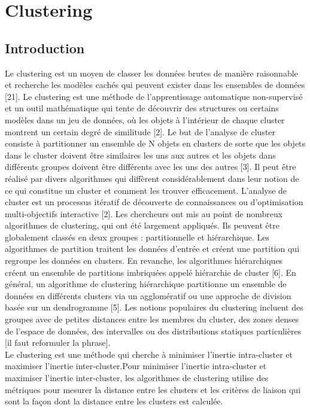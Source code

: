 \chapter{Clustering}
\minitoc
\thispagestyle{empty}
\newpage

\section{Introduction}
Le clustering est un moyen de classer les données brutes de manière raisonnable et recherche les modèles cachés qui peuvent exister dans les ensembles de données [21].
Le clustering est une méthode de l’apprentissage automatique non-supervisé et un outil mathématique qui tente de découvrir des structures ou certains modèles dans un jeu de données, où les objets à l'intérieur de chaque cluster montrent un certain degré de similitude [2]. Le but de l'analyse de cluster consiste à partitionner un ensemble de N objets en clusters de sorte que les objets dans le cluster doivent être similaires les uns aux autres et les objets dans différents groupes doivent être différents avec les uns des autres [3]. Il peut être réalisé par divers algorithmes qui diffèrent considérablement dans leur notion de ce qui constitue un cluster et comment les trouver efficacement. L'analyse de cluster est un processus itératif de découverte de connaissances ou d'optimisation multi-objectifs interactive [2]. Les chercheurs ont mis au point de nombreux algorithmes de clustering, qui ont été largement appliqués. Ils peuvent être globalement classés en deux groupes : partitionnelle et hiérarchique. Les algorithmes de partition traitent les données d'entrée et créent une partition qui regroupe les données en clusters. En revanche, les algorithmes hiérarchiques créent un ensemble de partitions imbriquées appelé hiérarchie de cluster [6]. En général, un algorithme de clustering hiérarchique partitionne un ensemble de données en différents clusters via un agglomératif ou une approche de division basée sur un dendrogramme [5].
Les notions populaires du clustering incluent des groupes avec de petites distances entre les membres du cluster, des zones denses de l’espace de données, des intervalles ou des distributions statiques particulières [il faut reformuler la phrase]. \\

Le clustering est une méthode qui cherche à minimiser l’inertie intra-cluster et maximiser l’inertie inter-cluster.Pour minimiser l’inertie intra-cluster et maximiser l’inertie inter-cluster, les algorithmes de clustering utilise des métriques pour mesurer la distance entre les clusters et les critères de liaison qui sont la façon dont la distance entre les clusters est calculée. \\


